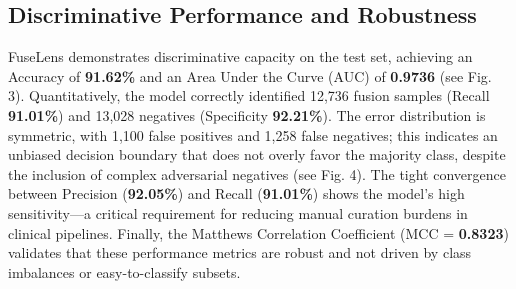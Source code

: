 \documentclass{bioinfo}
\begin{document}
\subsection{Discriminative Performance and Robustness}
\begin{table}[h]
    \centering
    \caption{Final test set metrics.}
    \label{tab:test_metrics}
\end{table}
FuseLens demonstrates discriminative capacity on the test set, achieving an Accuracy of \textbf{91.62\%} and an Area Under the Curve (AUC) of \textbf{0.9736} (see Fig. 3). 
Quantitatively, the model correctly identified 12,736 fusion samples (Recall \textbf{91.01\%}) and 13,028 negatives (Specificity \textbf{92.21\%}). 
The error distribution is symmetric, with 1,100 false positives and 1,258 false negatives; this indicates an unbiased decision boundary that does not overly favor the majority class, despite the inclusion of complex adversarial negatives (see Fig. 4). 
The tight convergence between Precision (\textbf{92.05\%}) and Recall (\textbf{91.01\%}) shows the model's high sensitivity—a critical requirement for reducing manual curation burdens in clinical pipelines. 
Finally, the Matthews Correlation Coefficient (MCC = \textbf{0.8323}) validates that these performance metrics are robust and not driven by class imbalances or easy-to-classify subsets.
\end{document}
